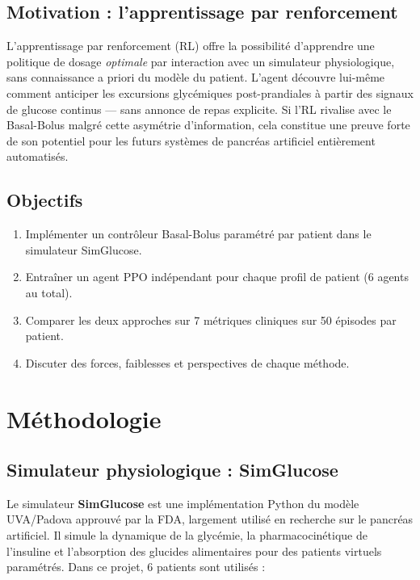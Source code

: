 \documentclass[a4paper,12pt]{report}
\begin{document}
\section{Motivation : l'apprentissage par renforcement}

L'apprentissage par renforcement (RL) offre la possibilité d'apprendre une politique de dosage \emph{optimale} par interaction avec un simulateur physiologique, sans connaissance a priori du modèle du patient. L'agent découvre lui-même comment anticiper les excursions glycémiques post-prandiales à partir des signaux de glucose continus --- sans annonce de repas explicite. Si l'RL rivalise avec le Basal-Bolus malgré cette asymétrie d'information, cela constitue une preuve forte de son potentiel pour les futurs systèmes de pancréas artificiel entièrement automatisés.

\section{Objectifs}

\begin{enumerate}
  \item Implémenter un contrôleur Basal-Bolus paramétré par patient dans le simulateur SimGlucose.
  \item Entraîner un agent PPO indépendant pour chaque profil de patient (6 agents au total).
  \item Comparer les deux approches sur 7 métriques cliniques sur 50 épisodes par patient.
  \item Discuter des forces, faiblesses et perspectives de chaque méthode.
\end{enumerate}

\newpage

\chapter{Méthodologie}

\section{Simulateur physiologique : SimGlucose}

Le simulateur \textbf{SimGlucose} est une implémentation Python du modèle UVA/Padova approuvé par la FDA, largement utilisé en recherche sur le pancréas artificiel. Il simule la dynamique de la glycémie, la pharmacocinétique de l'insuline et l'absorption des glucides alimentaires pour des patients virtuels paramétrés. Dans ce projet, 6 patients sont utilisés :
\end{document}
